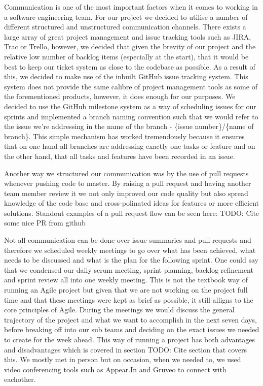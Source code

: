 \documentclass[a4paper]{article}
\begin{document}
	Communication is one of the most important factors when it comes to working in a software engineering team. For our project we decided to utilise a number of different structured and unstructured communication channels. There exists a large array of great project management and issue tracking tools such as JIRA, Trac or Trello, however, we decided that given the brevity of our project and the relative low number of backlog items (especially at the start), that it would be best to keep our ticket system as close to the codebase as possible. As a result of this, we decided to make use of the inbuilt GitHub issue tracking system. This system does not provide the same calibre of project management tools as some of the forementioned products, however, it does enough for our purposes. We decided to use the GitHub milestone system as a way of scheduling issues for our sprints and implemented a branch naming convention such that we would refer to the issue we're addressing in the name of the branch - \{issue number\}/\{name of branch\}. This simple mechanism has worked tremendously because it ensures that on one hand all branches are addressing exactly one tasks or feature and on the other hand, that all tasks and features have been recorded in an issue. 
	
	Another way we structured our communication was by the use of pull requests whenever pushing code to master. By raising a pull request and having another team member review it we not only improved our code quality but also spread knowledge of the code base and cross-polinated ideas for features or more efficient solutions. Standout examples of a pull request flow can be seen here: TODO: Cite some nice PR from github
	
	Not all communication can be done over issue summaries and pull requests and therefore we scheduled weekly meetings to go over what has been achieved, what needs to be discussed and what is the plan for the following sprint. One could say that we condensed our daily scrum meeting, sprint planning, backlog refinement and sprint review all into one weekly meeting. This is not the textbook way of running an Agile project but given that we are not working on the project full time and that these meetings were kept as brief as possible, it still alligns to the core principles of Agile. During the meetings we would discuss the general trajectory of the project and what we want to accomplish in the next seven days, before breaking off into our sub teams and deciding on the exact issues we needed to create for the week ahead. This way of running a project has both advantages and disadvantages which is covered in section TODO: Cite section that covers this. We mostly met in person but on occasion, when we needed to, we used video conferencing tools such as Appear.In and Gruveo to connect with eachother.
	
\end{document}
